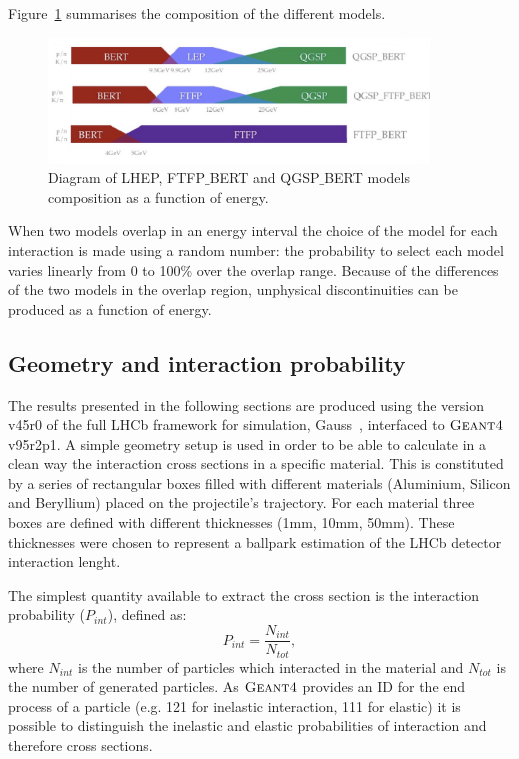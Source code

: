 Figure~\ref{fig:models} summarises the composition of the different models.
%
\begin{center}
\begin{figure}[b]
\centering \includegraphics[width=0.9\textwidth]{detector/figs/validation/models.png}
\caption{Diagram of LHEP, FTFP$\_$BERT and QGSP$\_$BERT models composition as a function of energy.}
\label{fig:models}
\end{figure}
\end{center}
%
When two models overlap in an energy interval the choice of the model
for each interaction is made using a random number: the probability to select each model varies linearly
from 0 to 100\% over the overlap range. Because of the differences of the two models in the overlap region,
unphysical discontinuities can be produced as a function of energy.

\subsection{Geometry and interaction probability}
\label{GeomandPint}

The results presented in the following sections are produced using the version v45r0 of the full LHCb framework
for simulation, Gauss~\cite{LHCb-PROC-2011-006}, interfaced to $\textsc{Geant4}$ v95r2p1.
A simple geometry setup is used in order to be able to calculate in a clean way the interaction cross sections in a specific material.
This is constituted by a series of rectangular boxes filled with different materials (Aluminium, Silicon and Beryllium) placed on the projectile's trajectory.
For each material three boxes are defined with different thicknesses (1mm, 10mm, 50mm). These thicknesses were chosen to
represent a ballpark estimation of the LHCb detector interaction lenght.

The simplest quantity available to extract the cross section is the interaction probability ($P_{int}$), defined as:
%
\begin{equation}
P_{int} = \frac{N_{int}}{N_{tot}},
\end{equation}
%
where $N_{int}$ is the number of particles which interacted in the material and $N_{tot}$ is the number of generated particles.
As $\textsc{Geant4}$ provides an ID for the end process of a particle (e.g. 121 for inelastic interaction, 111 for elastic) it is possible to distinguish
the inelastic and elastic probabilities of interaction and therefore cross sections.

